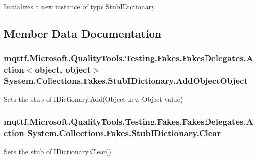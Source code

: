 Initializes a new instance of type \hyperlink{class_system_1_1_collections_1_1_fakes_1_1_stub_i_dictionary}{Stub\-I\-Dictionary}



\subsection{Member Data Documentation}
\hypertarget{class_system_1_1_collections_1_1_fakes_1_1_stub_i_dictionary_ae26c41b617b447739758f02ee2ef9220}{
\subsubsection[{Add\-Object\-Object}]{\setlength{\rightskip}{0pt plus 5cm}mqttf.\-Microsoft.\-Quality\-Tools.\-Testing.\-Fakes.\-Fakes\-Delegates.\-Action$<$object, object$>$ System.\-Collections.\-Fakes.\-Stub\-I\-Dictionary.\-Add\-Object\-Object}}\label{class_system_1_1_collections_1_1_fakes_1_1_stub_i_dictionary_ae26c41b617b447739758f02ee2ef9220}


Sets the stub of I\-Dictionary.\-Add(\-Object key, Object value)

\hypertarget{class_system_1_1_collections_1_1_fakes_1_1_stub_i_dictionary_a55be8c5e7f6ed067ba75841274538efc}{
\subsubsection[{Clear}]{\setlength{\rightskip}{0pt plus 5cm}mqttf.\-Microsoft.\-Quality\-Tools.\-Testing.\-Fakes.\-Fakes\-Delegates.\-Action System.\-Collections.\-Fakes.\-Stub\-I\-Dictionary.\-Clear}}\label{class_system_1_1_collections_1_1_fakes_1_1_stub_i_dictionary_a55be8c5e7f6ed067ba75841274538efc}


Sets the stub of I\-Dictionary.\-Clear()

